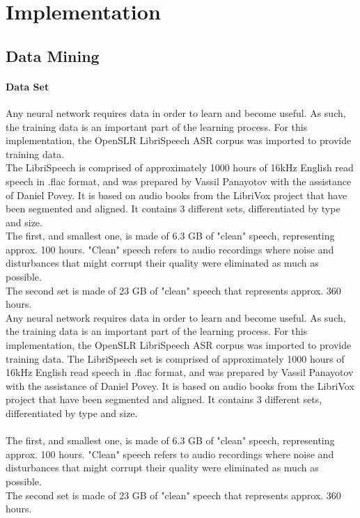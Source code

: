 \chapter{Implementation}\label{ch:implementation}

\section{Data Mining}
\subsubsection{Data Set}

Any neural network requires data in order to learn and become useful. As such, the training data is an important part of the learning process. For this implementation, the OpenSLR LibriSpeech ASR corpus was imported to provide training data.\\

The LibriSpeech is comprised of approximately 1000 hours of 16kHz English read speech in .flac format, and was prepared by Vassil Panayotov with the assistance of Daniel Povey. It is based on audio books from the LibriVox project that have been segmented and aligned. It contains 3 different sets, differentiated by type and size.\\ 

The first, and smallest one, is made of 6.3 GB of "clean" speech, representing approx. 100 hours. "Clean" speech refers to audio recordings where noise and disturbances that might corrupt their quality were eliminated as much as possible.\\ 

The second set is made of 23 GB of "clean" speech that represents approx. 360 hours.\\

Any neural network requires data in order to learn and become useful. As such, the training data is an important part of the learning process. For this implementation, the OpenSLR LibriSpeech ASR corpus was imported to provide training data.
The LibriSpeech set is comprised of approximately 1000 hours of 16kHz English read speech in .flac format, and was prepared by Vassil Panayotov with the assistance of Daniel Povey. It is based on audio books from the LibriVox project that have been segmented and aligned. It contains 3 different sets, differentiated by type and size.\\\\
The first, and smallest one, is made of 6.3 GB of "clean" speech, representing approx. 100 hours. "Clean" speech refers to audio recordings where noise and disturbances that might corrupt their quality were eliminated as much as possible.\\ 
The second set is made of 23 GB of "clean" speech that represents approx. 360 hours.


